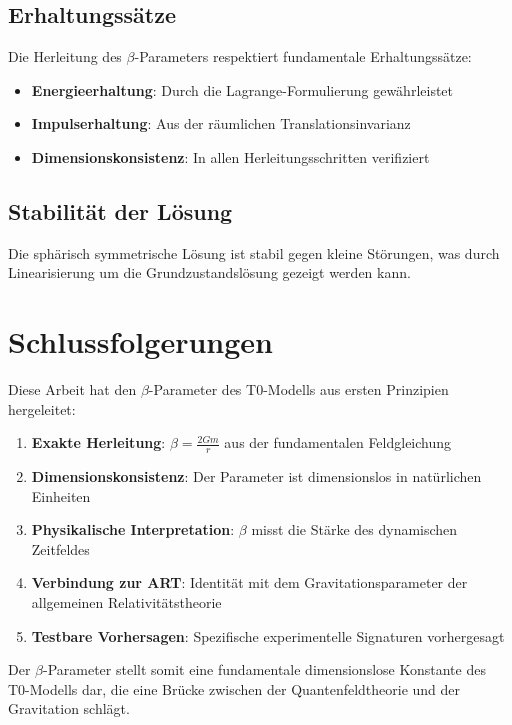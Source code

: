 	\subsection{Erhaltungssätze}
	\label{subsec:conservation_laws}
	
	Die Herleitung des $\beta$-Parameters respektiert fundamentale Erhaltungssätze:
	\begin{itemize}
		\item \textbf{Energieerhaltung}: Durch die Lagrange-Formulierung gewährleistet
		\item \textbf{Impulserhaltung}: Aus der räumlichen Translationsinvarianz
		\item \textbf{Dimensionskonsistenz}: In allen Herleitungsschritten verifiziert
	\end{itemize}
	
	\subsection{Stabilität der Lösung}
	\label{subsec:solution_stability}
	
	Die sphärisch symmetrische Lösung ist stabil gegen kleine Störungen, was durch Linearisierung um die Grundzustandslösung gezeigt werden kann.
	
	\section{Schlussfolgerungen}
	\label{sec:conclusions}
	
	Diese Arbeit hat den $\beta$-Parameter des T0-Modells aus ersten Prinzipien hergeleitet:
	
	\begin{tcolorbox}[colback=green!5!white,colframe=green!75!black,title=Hauptergebnisse]
		\begin{enumerate}
			\item \textbf{Exakte Herleitung}: $\beta = \frac{2Gm}{r}$ aus der fundamentalen Feldgleichung
			\item \textbf{Dimensionskonsistenz}: Der Parameter ist dimensionslos in natürlichen Einheiten
			\item \textbf{Physikalische Interpretation}: $\beta$ misst die Stärke des dynamischen Zeitfeldes
			\item \textbf{Verbindung zur ART}: Identität mit dem Gravitationsparameter der allgemeinen Relativitätstheorie
			\item \textbf{Testbare Vorhersagen}: Spezifische experimentelle Signaturen vorhergesagt
		\end{enumerate}
	\end{tcolorbox}
	
	Der $\beta$-Parameter stellt somit eine fundamentale dimensionslose Konstante des T0-Modells dar, die eine Brücke zwischen der Quantenfeldtheorie und der Gravitation schlägt.
	